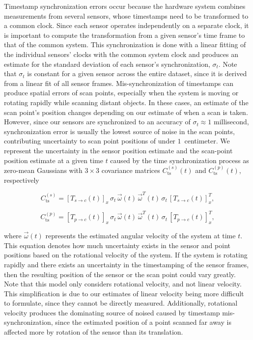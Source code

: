 \documentclass[12pt,onecolumn,oneside]{book}
\begin{document}
Timestamp synchronization errors occur because the hardware system combines measurements from several sensors, whose timestamps need to be transformed to a common clock.  Since each sensor operates independently on a separate clock, it is important to compute the transformation from a given sensor's time frame to that of the common system.  This synchronization is done with a linear fitting of the individual sensors' clocks with the common system clock and produces an estimate for the standard deviation of each sensor's synchronization, $\sigma_t$.  Note that $\sigma_t$ is constant for a given sensor across the entire dataset, since it is derived from a linear fit of all sensor frames.  Mis-synchronization of timestamps can produce spatial errors of scan points, especially when the system is moving or rotating rapidly while scanning distant objects.  In these cases, an estimate of the scan point's position changes depending on our estimate of when a scan is taken.  However, since our sensors are synchronized to an accuracy of $\sigma_t \approx 1$ millisecond, synchronization error is usually the lowest source of noise in the scan points, contributing uncertainty to scan point positions of under $1$~centimeter.  We represent the uncertainty in the sensor position estimate and the scan-point position estimate at a given time $t$ caused by the time synchronization process as zero-mean Gaussians with $3 \times 3$ covariance matrices $C^{(s)}_{\mathrm{ts}}(t)$ and $C^{(p)}_{\mathrm{ts}}(t)$, respectively

\begin{equation}
C^{(s)}_{\mathrm{ts}} = \left[ T_{s\rightarrow c}(t) \right]_x \, \sigma_{t} \, \vec{\omega}(t) \, \vec{\omega}^T(t) \, \sigma_{t} \, \left[ T_{s\rightarrow c}(t) \right]_x^T,
\end{equation}

\begin{equation}
C^{(p)}_{\mathrm{ts}} = \left[ T_{p\rightarrow c}(t) \right]_x \, \sigma_{t} \, \vec{\omega}(t) \, \vec{\omega}^T(t) \, \sigma_{t} \, \left[ T_{p\rightarrow c}(t) \right]_x^T,
\end{equation}

\noindent where $\vec{\omega}(t)$ represents the estimated angular velocity of the system at time $t$.  This equation denotes how much uncertainty exists in the sensor and point positions based on the rotational velocity of the system.  If the system is rotating rapidly and there exists an uncertainty in the timestamping of the sensor frames, then the resulting position of the sensor or the scan point could vary greatly.  Note that this model only considers rotational velocity, and not linear velocity.  This simplification is due to our estimates of linear velocity being more difficult to formulate, since they cannot be directly measured.  Additionally, rotational velocity produces the dominating source of noised caused by timestamp mis-synchronization, since the estimated position of a point scanned far away is affected more by rotation of the sensor than its translation.
\end{document}
